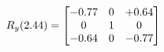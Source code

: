 \documentclass[preview]{standalone}
\begin{document}
\begin{align*}
\special{dvisvgm:raw <g id='unique000'>}R_{y}(2.44) = \begin{bmatrix}-0.77 & 0 & +0.64 \\0 & 1 & 0 \\-0.64 & 0 & -0.77\end{bmatrix}\special{dvisvgm:raw </g>}
\end{align*}
\end{document}
